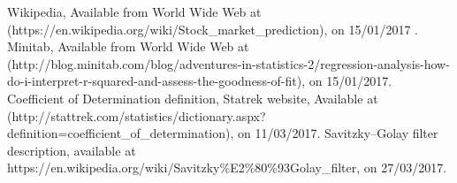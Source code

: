 \begin{thebibliography}{9}
 Wikipedia, Available from World Wide Web at (https://en.wikipedia.org/wiki/Stock\_market\_prediction), on 15/01/2017 .
 Minitab, Available from World Wide Web at (http://blog.minitab.com/blog/adventures-in-statistics-2/regression-analysis-how-do-i-interpret-r-squared-and-assess-the-goodness-of-fit), on 15/01/2017.
 Coefficient of Determination definition, Statrek website, Available at (http://stattrek.com/statistics/dictionary.aspx?definition=coefficient\_of\_determination), on 11/03/2017.
 Savitzky–Golay filter description, available at https://en.wikipedia.org/wiki/Savitzky\%E2\%80\%93Golay\_filter, on 27/03/2017.

\end{thebibliography}